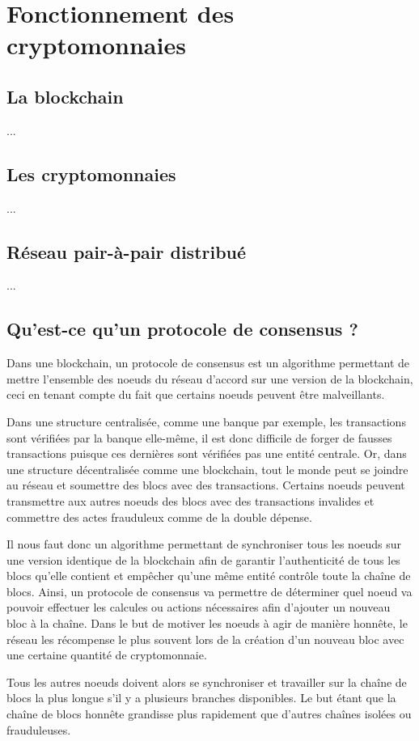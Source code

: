\documentclass[../tb_report.tex]{subfiles}
\begin{document}
  
\chapter{Fonctionnement des cryptomonnaies}
\label{ch:presentation}

\section{La blockchain}

...

\section{Les cryptomonnaies}

...

\section{Réseau pair-à-pair distribué}

...

\section{Qu'est-ce qu'un protocole de consensus ?}

Dans une blockchain, un protocole de consensus est un algorithme permettant de mettre l'ensemble des noeuds du réseau d'accord sur une version de la blockchain, ceci en tenant compte du fait que certains noeuds peuvent être malveillants.

Dans une structure centralisée, comme une banque par exemple, les transactions sont vérifiées par la banque elle-même, il est donc difficile de forger de fausses transactions puisque ces dernières sont vérifiées pas une entité centrale. Or, dans une structure décentralisée comme une blockchain, tout le monde peut se joindre au réseau et soumettre des blocs avec des transactions. Certains noeuds peuvent transmettre aux autres noeuds des blocs avec des transactions invalides et commettre des actes frauduleux comme de la double dépense.

Il nous faut donc un algorithme permettant de synchroniser tous les noeuds sur une version identique de la blockchain afin de garantir l'authenticité de tous les blocs qu'elle contient et empêcher qu'une même entité contrôle toute la chaîne de blocs. Ainsi, un protocole de consensus va permettre de déterminer quel noeud va pouvoir effectuer les calcules ou actions nécessaires afin d'ajouter un nouveau bloc à la chaîne. Dans le but de motiver les noeuds à agir de manière honnête, le réseau les récompense le plus souvent lors de la création d'un nouveau bloc avec une certaine quantité de cryptomonnaie. 

Tous les autres noeuds doivent alors se synchroniser et travailler sur la chaîne de blocs la plus longue s'il y a plusieurs branches disponibles. Le but étant que la chaîne de blocs honnête grandisse plus rapidement que d'autres chaînes isolées ou frauduleuses.
\end{document}
